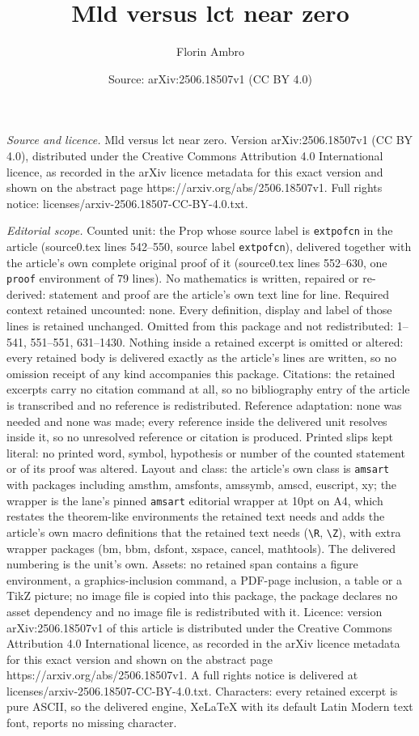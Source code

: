 \documentclass[10pt,a4paper]{amsart}
\title[Mld versus lct near zero]{Mld versus lct near zero}
\author{Florin Ambro}
\date{Source: arXiv:2506.18507v1 (CC BY 4.0)}
\begin{document}
\maketitle

\noindent\emph{Source and licence.} Mld versus lct near zero. Version arXiv:2506.18507v1 (CC BY 4.0), distributed under the Creative Commons Attribution 4.0 International licence, as recorded in the arXiv licence metadata for this exact version and shown on the abstract page https://arxiv.org/abs/2506.18507v1. Full rights notice: licenses/arxiv-2506.18507-CC-BY-4.0.txt.\par\smallskip

\noindent\textit{Editorial scope.} Counted unit: the Prop whose source label is \texttt{extpofcn} in the article (source0.tex lines 542--550, source label \texttt{extpofcn}), delivered together with the article's own complete original proof of it (source0.tex lines 552--630, one \texttt{proof} environment of 79 lines). No mathematics is written, repaired or re-derived: statement and proof are the article's own text line for line. Required context retained uncounted: none. Every definition, display and label of those lines is retained unchanged. Omitted from this package and not redistributed: 1--541, 551--551, 631--1430. Nothing inside a retained excerpt is omitted or altered: every retained body is delivered exactly as the article's lines are written, so no omission receipt of any kind accompanies this package. Citations: the retained excerpts carry no citation command at all, so no bibliography entry of the article is transcribed and no reference is redistributed. Reference adaptation: none was needed and none was made; every reference inside the delivered unit resolves inside it, so no unresolved reference or citation is produced. Printed slips kept literal: no printed word, symbol, hypothesis or number of the counted statement or of its proof was altered. Layout and class: the article's own class is \texttt{amsart} with packages including amsthm, amsfonts, amssymb, amscd, euscript, xy; the wrapper is the lane's pinned \texttt{amsart} editorial wrapper at 10pt on A4, which restates the theorem-like environments the retained text needs and adds the article's own macro definitions that the retained text needs (\texttt{\textbackslash R}, \texttt{\textbackslash Z}), with extra wrapper packages (bm, bbm, dsfont, xspace, cancel, mathtools). The delivered numbering is the unit's own. Assets: no retained span contains a figure environment, a graphics-inclusion command, a PDF-page inclusion, a table or a TikZ picture; no image file is copied into this package, the package declares no asset dependency and no image file is redistributed with it. Licence: version arXiv:2506.18507v1 of this article is distributed under the Creative Commons Attribution 4.0 International licence, as recorded in the arXiv licence metadata for this exact version and shown on the abstract page https://arxiv.org/abs/2506.18507v1. A full rights notice is delivered at licenses/arxiv-2506.18507-CC-BY-4.0.txt. Characters: every retained excerpt is pure ASCII, so the delivered engine, XeLaTeX with its default Latin Modern text font, reports no missing character.
\end{document}
